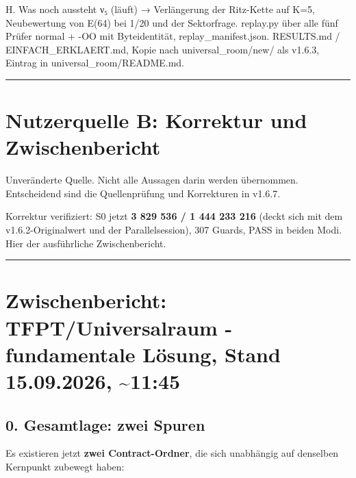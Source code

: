 H. Was noch aussteht ν₅ (läuft) → Verlängerung der Ritz-Kette auf K=5,
Neubewertung von E(64) bei 1/20 und der Sektorfrage. replay.py über alle
fünf Prüfer normal + -OO mit Byteidentität, replay\_manifest.json.
RESULTS.md / EINFACH\_ERKLAERT.md, Kopie nach universal\_room/new/ als
v1.6.3, Eintrag in universal\_room/README.md.

\begin{center}\rule{0.5\linewidth}{0.5pt}\end{center}

\section{Nutzerquelle B: Korrektur und
Zwischenbericht}\label{nutzerquelle-b-korrektur-und-zwischenbericht}

Unveränderte Quelle. Nicht alle Aussagen darin werden übernommen.
Entscheidend sind die Quellenprüfung und Korrekturen in v1.6.7.

Korrektur verifiziert: S0 jetzt \textbf{3 829 536 / 1 444 233 216}
(deckt sich mit dem v1.6.2-Originalwert und der Parallelsession), 307
Guards, PASS in beiden Modi. Hier der ausführliche Zwischenbericht.

\begin{center}\rule{0.5\linewidth}{0.5pt}\end{center}

\section{Zwischenbericht: TFPT/Universalraum - fundamentale Lösung,
Stand 15.09.2026,
\textasciitilde11:45}\label{zwischenbericht-tfptuniversalraum---fundamentale-luxf6sung-stand-15.09.2026-1145}

\subsection{0. Gesamtlage: zwei Spuren}\label{gesamtlage-zwei-spuren}

Es existieren jetzt \textbf{zwei Contract-Ordner}, die sich unabhängig
auf denselben Kernpunkt zubewegt haben:

